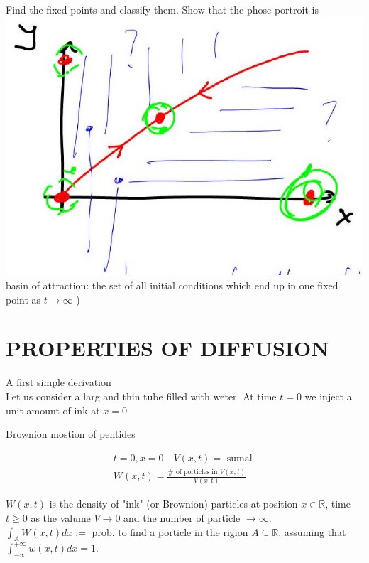 \documentclass[10pt]{article}
\begin{document}
Find the fixed points and classify them. Show that the phose portroit is\\
\includegraphics[max width=\textwidth, center]{2025_10_19_55a7d61d84e6ce9a1c8cg-7}\\
basin of attraction: the set of all initial conditions which end up in one fixed point as $t \rightarrow \infty$ )

\section*{PROPERTIES OF DIFFUSION}
A first simple derivation\\
Let us consider a larg and thin tube filled with weter. At time $t=0$ we inject a unit amount of ink at $x=0$

Brownion mostion of pentides

$$
\begin{gathered}
t=0, x=0 \quad V(x, t)=\text { sumal } \\
W(x, t)=\frac{\# \text { of porticles in } V(x, t)}{V(x, t)}
\end{gathered}
$$

$W(x, t)$ is the density of "ink" (or Brownion) particles at position $x \in \mathbb{R}$, time $t \geqslant 0$ as the valume $V \rightarrow 0$ and the number of particle $\rightarrow \infty$.\\
$\int_{A} W(x, t) d x:=$ prob. to find a porticle in the rigion $A \subseteq \mathbb{R}$. assuming that $\int_{-\infty}^{+\infty} w(x, t) d x=1$.
\end{document}
